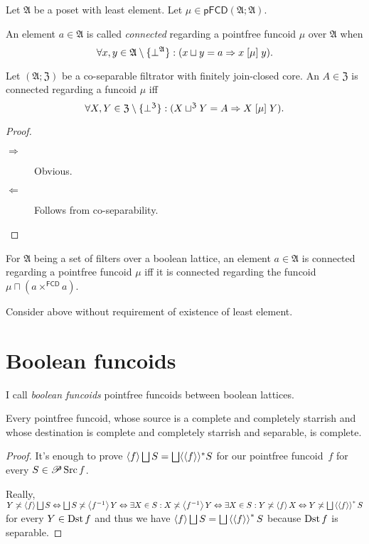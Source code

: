 Let $\mathfrak{A}$ be a poset with least element. Let $\mu\in\mathsf{pFCD}(\mathfrak{A};\mathfrak{A})$.
\begin{defn}
An element $a\in\mathfrak{A}$
is called \emph{connected} regarding a pointfree funcoid $\mu$ over
$\mathfrak{A}$ when 
\[
\forall x,y\in\mathfrak{A}\setminus\{\bot^{\mathfrak{A}}\}:(x\sqcup y=a\Rightarrow x\mathrel{\left[\mu\right]}y).
\]
\end{defn}
\begin{prop}
Let $(\mathfrak{A};\mathfrak{Z})$ be a co-separable filtrator with
finitely join-closed core. An $A\in\mathfrak{Z}$ is connected regarding a
funcoid $\mu$ iff 
\[
\forall X,Y\in\mathfrak{Z}\setminus\{\bot^{\mathfrak{Z}}\}:(X\sqcup^{\mathfrak{Z}}Y=A\Rightarrow X\mathrel{\left[\mu\right]}Y).
\]
\end{prop}
\begin{proof}
~
\begin{description}
\item [{$\Rightarrow$}] Obvious.
\item [{$\Leftarrow$}] Follows from co-separability.
\end{description}
\end{proof}
\begin{obvious}
For $\mathfrak{A}$ being a set of filters over a boolean lattice,
an element $a\in\mathfrak{A}$ is connected regarding a pointfree
funcoid $\mu$ iff it is connected regarding the funcoid $\mu\sqcap(a\times^{\mathsf{FCD}}a)$.\end{obvious}
\begin{xca}
Consider above without requirement of existence of least element.
\end{xca}

\section{Boolean funcoids}

I call \emph{boolean funcoids} pointfree funcoids between boolean lattices.

\begin{prop}
  Every pointfree funcoid, whose source is a complete and completely starrish and whose destination is complete and completely starrish and separable,
  is complete.
\end{prop}

\begin{proof}
  It's enough to prove $\supfun{f} \bigsqcup S = \bigsqcup \langle
  \supfun{f} \rangle^{\ast} S$ for our pointfree funcoid~$f$ for every $S
  \in \mathscr{P} \operatorname{Src} f$.
  
  Really, $Y \nasymp \supfun{f} \bigsqcup S \Leftrightarrow \bigsqcup S
  \nasymp \supfun{f^{- 1}} Y \Leftrightarrow \exists X \in S : X
  \nasymp \supfun{f^{- 1}} Y \Leftrightarrow \exists X \in S : Y
  \nasymp \supfun{f} X \Leftrightarrow Y \nasymp \bigsqcup \rsupfun{\supfun{f}} S$ for every $Y \in \operatorname{Dst} f$ and thus
  we have $\supfun{f} \bigsqcup S = \bigsqcup
  \rsupfun{\supfun{f}} S$ because $\operatorname{Dst} f$ is separable.
\end{proof}


